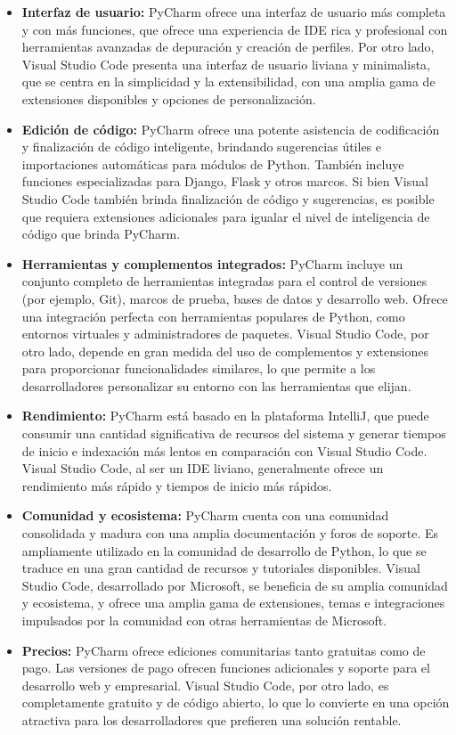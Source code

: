 \begin{itemize}
    \item \textbf{Interfaz de usuario:} PyCharm ofrece una interfaz de usuario más completa y con más funciones, que ofrece una experiencia de IDE rica y profesional con herramientas avanzadas de depuración y creación de perfiles. Por otro lado, Visual Studio Code presenta una interfaz de usuario liviana y minimalista, que se centra en la simplicidad y la extensibilidad, con una amplia gama de extensiones disponibles y opciones de personalización.
    \item \textbf{Edición de código:} PyCharm ofrece una potente asistencia de codificación y finalización de código inteligente, brindando sugerencias útiles e importaciones automáticas para módulos de Python. También incluye funciones especializadas para Django, Flask y otros marcos. Si bien Visual Studio Code también brinda finalización de código y sugerencias, es posible que requiera extensiones adicionales para igualar el nivel de inteligencia de código que brinda PyCharm.
    \item \textbf{Herramientas y complementos integrados:} PyCharm incluye un conjunto completo de herramientas integradas para el control de versiones (por ejemplo, Git), marcos de prueba, bases de datos y desarrollo web. Ofrece una integración perfecta con herramientas populares de Python, como entornos virtuales y administradores de paquetes. Visual Studio Code, por otro lado, depende en gran medida del uso de complementos y extensiones para proporcionar funcionalidades similares, lo que permite a los desarrolladores personalizar su entorno con las herramientas que elijan.
    \item \textbf{Rendimiento:} PyCharm está basado en la plataforma IntelliJ, que puede consumir una cantidad significativa de recursos del sistema y generar tiempos de inicio e indexación más lentos en comparación con Visual Studio Code. Visual Studio Code, al ser un IDE liviano, generalmente ofrece un rendimiento más rápido y tiempos de inicio más rápidos.
    \item \textbf{Comunidad y ecosistema:} PyCharm cuenta con una comunidad consolidada y madura con una amplia documentación y foros de soporte. Es ampliamente utilizado en la comunidad de desarrollo de Python, lo que se traduce en una gran cantidad de recursos y tutoriales disponibles. Visual Studio Code, desarrollado por Microsoft, se beneficia de su amplia comunidad y ecosistema, y ofrece una amplia gama de extensiones, temas e integraciones impulsados por la comunidad con otras herramientas de Microsoft.
    \item \textbf{Precios:} PyCharm ofrece ediciones comunitarias tanto gratuitas como de pago. Las versiones de pago ofrecen funciones adicionales y soporte para el desarrollo web y empresarial. Visual Studio Code, por otro lado, es completamente gratuito y de código abierto, lo que lo convierte en una opción atractiva para los desarrolladores que prefieren una solución rentable.
\end{itemize}

